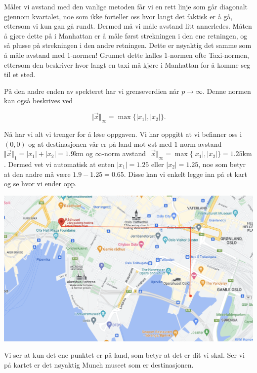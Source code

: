 Måler vi avstand med den vanlige metoden får vi en rett linje som går diagonalt gjennom kvartalet, noe som ikke forteller oss hvor langt det faktisk er å gå, ettersom vi kun gan gå rundt. Dermed må vi måle avstand litt annerledes. Måten å gjøre dette på i Manhattan er å måle først strekningen i den ene retningen, og så plusse på strekningen i den andre retningen. Dette er nøyaktig det samme som å måle avstand med $1$-normen! Grunnet dette kalles $1$-normen ofte Taxi-normen, ettersom den beskriver hvor langt en taxi må kjøre i Manhattan for å komme seg til et sted. 

På den andre enden av spekteret har vi grenseverdien når $p\to \infty$. Denne normen kan også beskrives ved 

$$
\Vert \vec x \Vert_\infty = \max\{|x_1|, |x_2|\}.
$$

Nå har vi alt vi trenger for å løse oppgaven. Vi har oppgitt at vi befinner oss i $(0,0)$ og at destinasjonen vår er på land mot øst med $1$-norm avstand $\Vert \vec x \Vert_1 = |x_1|+|x_2| = 1.9\mathrm{km}$ og $\infty$-norm avstand $\Vert \vec x \Vert_\infty = \max\{|x_1|, |x_2|\}=1.25\mathrm{km}$. Dermed vet vi automatisk at enten $|x_1|=1.25$ eller $|x_2|=1.25$, noe som betyr at den andre må være $1.9-1.25 = 0.65$. Disse kan vi enkelt legge inn på et kart og se hvor vi ender opp. 

\begin{center}
    \includegraphics[width=\textwidth]{img/munch_2.png}
\end{center}

Vi ser at kun det ene punktet er på land, som betyr at det er dit vi skal. Ser vi på kartet er det nøyaktig Munch museet som er destinasjonen. 

